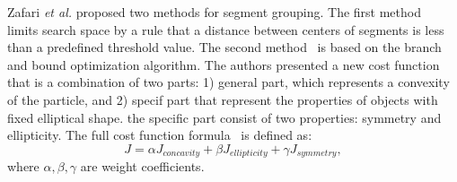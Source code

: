\documentclass{lutmscthesis}[2010/09/22]
\begin{document}
\begin{figure}[htp]
\end{figure}

Zafari \emph{et al.} proposed two methods for segment grouping.  The first method~\cite{zafari-bb} limits search space by a rule that a distance between centers of segments is less than a predefined threshold value. The second method~\cite{zafari-bb} is based on the branch and bound optimization algorithm. The authors presented a new cost function that is a combination of two parts: 1) general part, which represents a convexity of the particle, and 2) specif part that represent the properties of objects with fixed elliptical shape. the specific part consist of two properties: symmetry and ellipticity. The full cost function formula~\cite{zafari-bb} is defined as:
\begin{equation}
    J = \alpha J_{concavity}+\beta J_{ellipticity} + \gamma J_{symmetry},
\end{equation} where $\alpha,\beta,\gamma$ are weight coefficients.
\end{document}
